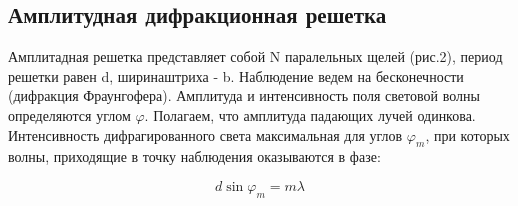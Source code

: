 \documentclass[a4paper,12pt]{article}
\theoremstyle{plain} %
\theoremstyle{definition} %
\theoremstyle{remark} %
\begin{document}
\subsection{Амплитудная дифракционная решетка}

Амплитадная решетка представляет собой N паралельных щелей (рис.2), период решетки равен d, ширинаштриха - b. Наблюдение ведем на бесконечности (дифракция Фраунгофера). Амплитуда и интенсивность поля
световой волны определяются углом $\varphi$. Полагаем, что амплитуда падающих лучей одинкова. Интенсивность дифрагированного света максимальная для углов $\varphi_m$, при которых волны, приходящие в точку наблюдения оказываются в фазе:

\begin{equation}
d \sin{\varphi_m} = m\lambda
\end{equation}
\end{document}
